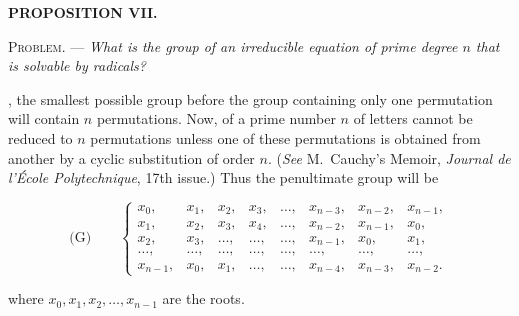
\begin{center}{\bfseries PROPOSITION VII.}\end{center}

\noindent\textsc{Problem.} --- {\itshape What is the group of an irreducible equation
of prime degree $n$ that is solvable by radicals?}

, the smallest possible group before the group
containing only one permutation will contain $n$ permutations. Now,
 of a prime number $n$ of letters cannot be
reduced to $n$ permutations unless one of these permutations is obtained from
another by a cyclic substitution of order $n$. (\emph{See} M.~Cauchy's Memoir,
\emph{Journal de l'École Polytechnique}, 17th issue.) Thus the
penultimate group will be


\[
\text{(G)}\qquad
\left\{
\begin{array}{cccccccc}
x_{0},    &x_{1}, &x_{2}, &x_{3}, &\ldots, &x_{n-3}, &x_{n-2}, &x_{n-1}, \\
x_{1},    &x_{2}, &x_{3}, &x_{4}, &\ldots, &x_{n-2}, &x_{n-1}, &x_{0}, \\
x_{2},    &x_{3}, &\ldots, &\ldots, &\ldots, &x_{n-1}, &x_{0}, &x_{1}, \\
\ldots,  &\ldots, &\ldots, &\ldots, &\ldots, &\ldots, &\ldots, &\ldots, \\
x_{n-1}, &x_{0}, &x_{1}, &\ldots, &\ldots, &x_{n-4}, &x_{n-3}, &x_{n-2}.
\end{array}
\right.
\]

where $x_{0},x_{1},x_{2},\ldots,x_{n-1}$ are the roots.

